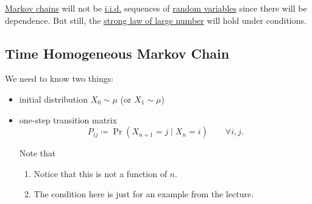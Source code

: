 \begin{note}
	\hyperref[def:Markov-chain]{Markov chains} will not be \hyperref[def:i.i.d.]{i.i.d.} sequences of \hyperref[def:random-variable]{random variables} since there will be dependence. But still, the \hyperref[thm:SLLN]{strong law of large number} will hold under conditions.
\end{note}

\subsection{Time Homogeneous Markov Chain}
We need to know two things:
\begin{itemize}
	\item initial distribution \(X_0 \sim \mu\) (or \(X_1\sim \mu\))
	\item one-step transition matrix
	      \[
		      P_{ij} \coloneqq \Pr(X_{n+1} = j \mid X_n = i)\qquad \forall i, j.
	      \]
	      \begin{note}
		      Note that
		      \begin{enumerate}
			      \item Notice that this is not a function of \(n\).
			      \item The condition here is just for an example from the lecture.
		      \end{enumerate}
	      \end{note}


\end{itemize}
